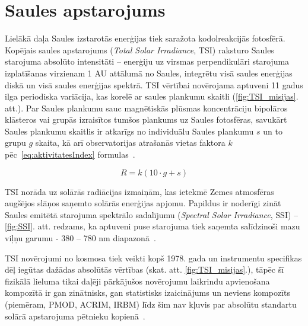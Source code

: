 \section{Saules apstarojums}

Lielākā daļa Saules izstarotās enerģijas tiek saražota kodolreakcijās fotosfērā. 
Kopējais saules apstarojums (\textit{Total Solar Irradiance}, TSI) raksturo Saules starojuma absolūto intensitāti -- enerģiju uz virsmas perpendikulāri starojuma izplatīšanas virzienam 1 AU attālumā no Saules, integrētu visā saules enerģijas diskā un visā saules enerģijas spektrā. TSI vērtībai novērojama aptuveni 11 gadus ilga periodiska variācija, kas korelē ar saules plankumu skaitli (\ref{fig:TSI_misijas}. att.). Par Saules plankumu sauc magnētiskās plūsmas koncentrāciju bipolāros klāsteros vai grupās izraisītos tumšos plankums uz Saules fotosfēras, savukārt Saules plankumu skaitlis ir atkarīgs no individuālu Saules plankumu $s$ un to grupu $g$ skaita, kā arī observatorijas atrašanās vietas faktora $k$
pēc~\ref{eq:aktivitatesIndex} formulas~\cite{ThermalProcesses}.

\begin{equation}
\label{eq:aktivitatesIndex}
R = k(10 \cdot g + s)
\end{equation}

TSI norāda uz solārās radiācijas izmaiņām, kas ietekmē Zemes atmosfēras augšējos slāņos saņemto solārās enerģijas apjomu. Papildus ir noderīgi zināt Saules emitētā starojuma spektrālo sadalījumu (\textit{Spectral Solar Irradiance}, SSI) -- \ref{fig:SSI}. att. redzams, ka aptuveni puse starojuma tiek saņemta salīdzinoši mazu viļņu garumu - 380 -- 780 nm diapazonā~\cite{ThermalProcesses}.

TSI novērojumi no kosmosa tiek veikti kopš 1978. gada un instrumentu specifikas dēļ iegūtas dažādas absolūtās vērtības (skat. att. \ref{fig:TSI_misijas}.), tāpēc šī fizikālā lieluma tikai daļēji pārkājušos novērojumu laikrindu apvienošana kompozītā ir gan zinātnisks, gan statistisks izaicinājums un neviens kompozīts (piemēram, PMOD, ACRIM, IRBM) līdz šim nav kļuvis par absolūtu standartu solārā apstarojuma pētnieku kopienā~\cite{Frohlich2012}.


